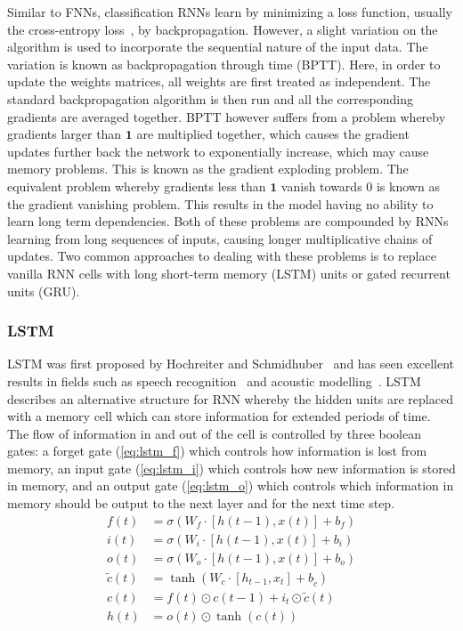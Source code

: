 Similar to FNNs, classification RNNs learn by minimizing a loss function,
usually the cross-entropy loss~\cite{shore1980axiomatic}, by backpropagation.
However, a slight variation on the algorithm is used to incorporate the
sequential nature of the input data. The variation is known as backpropagation
through time (BPTT). Here, in order to update the weights matrices, all weights
are first treated as independent. The standard backpropagation algorithm is then
run and all the corresponding gradients are averaged together. BPTT however
suffers from a problem whereby gradients larger than $\mathbf{1}$ are multiplied
together, which causes the gradient updates further back the network to
exponentially increase, which may cause memory problems. This is known as the
gradient exploding problem. The equivalent problem whereby gradients less than
$\mathbf{1}$ vanish towards 0 is known as the gradient vanishing problem. This
results in the model having no ability to learn long term dependencies. Both of
these problems are compounded by RNNs learning from long sequences of inputs,
causing longer multiplicative chains of updates. Two common approaches to
dealing with these problems is to replace vanilla RNN cells with long short-term
memory (LSTM) units or gated recurrent units (GRU).

\subsubsection{LSTM}

LSTM was first proposed by Hochreiter and Schmidhuber~\cite{hochreiter1997long}
and has seen excellent results in fields such as speech
recognition~\cite{he2016exploiting} and acoustic
modelling~\cite{qu2017syllable}. LSTM describes an alternative structure for RNN
whereby the hidden units are replaced with a memory cell which can store
information for extended periods of time. The flow of information in and out of
the cell is controlled by three boolean gates: a forget gate (\ref{eq:lstm_f})
which controls how information is lost from memory, an
input gate (\ref{eq:lstm_i}) which controls how new information is stored in
memory, and an output gate (\ref{eq:lstm_o}) which controls which information in
memory should be output to the next layer and for the next time step.
\begin{align}
  f(t) &= \sigma(W_f \cdot \left[ h(t-1),x(t) \right] + b_f) \label{eq:lstm_f} \\[0.5em]
  i(t) &= \sigma(W_i \cdot \left[ h(t-1),x(t) \right] + b_i) \label{eq:lstm_i} \\[0.5em]
  o(t) &= \sigma(W_o \cdot \left[ h(t-1),x(t) \right] + b_o) \label{eq:lstm_o} \\[0.5em]
  \tilde{c}(t) &= \tanh \left( 
    W_c \cdot \left[ h_{t-1},x_t \right] + b_{\tilde{c}}
  \right)\\[0.5em]
  c(t) &= f(t) \odot c(t-1) + i_t \odot \tilde{c}(t) \\[0.5em]
  h(t) &= o(t) \odot \tanh (c(t))
\end{align}

